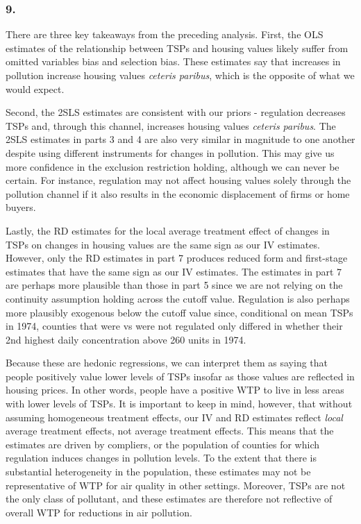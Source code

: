 \documentclass[12pt]{article}
\begin{document}
\subsubsection*{9.}
There are three key takeaways from the preceding analysis. First, the OLS estimates of the relationship between TSPs and housing values likely suffer from omitted variables bias and selection bias. These estimates say that increases in pollution increase housing values \emph{ceteris paribus}, which is the opposite of what we would expect. 

Second, the 2SLS estimates are consistent with our priors - regulation decreases TSPs and, through this channel, increases housing values \emph{ceteris paribus}. The 2SLS estimates in parts 3 and 4 are also very similar in magnitude to one another despite using different instruments for changes in pollution. This may give us more confidence in the exclusion restriction holding, although we can never be certain. For instance, regulation may not affect housing values solely through the pollution channel if it also results in the economic displacement of firms or home buyers. 

Lastly, the RD estimates for the local average treatment effect of changes in TSPs on changes in housing values are the same sign as our IV estimates. However, only the RD estimates in part 7 produces reduced form and first-stage estimates that have the same sign as our IV estimates. The estimates in part 7 are perhaps more plausible than those in part 5 since we are not relying on the continuity assumption holding across the cutoff value. Regulation is also perhaps more plausibly exogenous below the cutoff value since, conditional on mean TSPs in 1974, counties that were vs were not regulated only differed in whether their 2nd highest daily concentration above 260 units in 1974.

Because these are hedonic regressions, we can interpret them as saying that people positively value lower levels of TSPs insofar as those values are reflected in housing prices. In other words, people have a positive WTP to live in less areas with lower levels of TSPs. It is important to keep in mind, however, that without assuming homogeneous treatment effects, our IV and RD estimates reflect \emph{local} average treatment effects, not average treatment effects. This means that the estimates are driven by compliers, or the population of counties for which regulation induces changes in pollution levels. To the extent that there is substantial heterogeneity in the population, these estimates may not be representative of WTP for air quality in other settings. Moreover, TSPs are not the only class of pollutant, and these estimates are therefore not reflective of overall WTP for reductions in air pollution.
\end{document}

